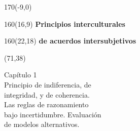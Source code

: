 \documentclass[shownotes,aspectratio=169]{beamer}
\begin{document}
\begin{frame}
\begin{textblock}{170}(-9,0)
\end{textblock}

\begin{textblock}{160}(16,9)
\LARGE \textcolor{black!5}{\fontsize{22}{0}\selectfont \textbf{Principios interculturales}}
\end{textblock}
\begin{textblock}{160}(22,18)
\LARGE \textcolor{black!5}{\fontsize{22}{0}\selectfont \textbf{de acuerdos intersubjetivos}}
\end{textblock}


\begin{textblock}{55}(71,38)
\begin{turn}{33}
\parbox{6cm}{
\textcolor{black!5}{\hspace{-0.3cm}Capítulo 1} \\
\small\textcolor{black!5}{\hspace{-0.1cm}Principio de indiferencia, de}\\
\small\textcolor{black!5}{integridad, y de coherencia.} \\
\small\textcolor{black!5}{\hspace{0.1cm}Las reglas de razonamiento} \\ \small\textcolor{black!5}{\hspace{0.15cm}bajo incertidumbre. Evaluación} \\
\small\textcolor{black!5}{\hspace{0.36cm}de modelos alternativos.} \\
}
\end{turn}
\end{textblock}

\end{frame}
\end{document}
